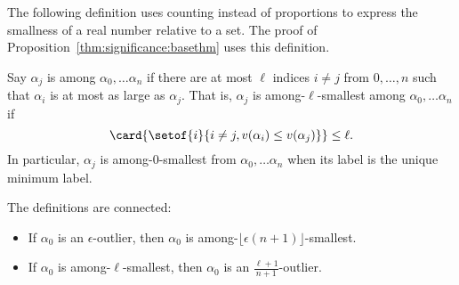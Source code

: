 \documentclass[12pt]{article}
\begin{document}
The following definition uses counting instead of proportions to express
the smallness of a real number relative to a set.  The proof of 
Proposition~\ref{thm:significance:basethm}  uses this definition.

\begin{definition}
    Say \( \alpha_j \) is %
    among \( \alpha_0, \dots \alpha_n \) if there are at most \( \ell \)
    indices \( i \ne j \) from \( 0, \dots, n \) such that  \(
    \alpha_i \) is at most as large as \( \alpha_j \).  That is, \(
    \alpha_j \) is among-\( \ell \)-smallest among \( \alpha_0, \dots
    \alpha_n \) if
    \[
      \card{ \setof{i}{i \ne j, v(\alpha_i) \le v(\alpha_j)}}
      \le \ell.
    \]  In particular, \( \alpha_j \) is among-\( 0 \)-smallest
    from \( \alpha_0, \dots \alpha_n \) when its label is the unique
    minimum label.
\end{definition}

\begin{remark}
    The definitions are connected:
    \begin{itemize}
        \item
            If \( \alpha_0 \) is an \( \epsilon \)-outlier, then \(
            \alpha_0 \) is among-\( \lfloor \epsilon (n+1) \rfloor \)-smallest.
        \item
            If \( \alpha_0 \) is among-\( \ell \)-smallest, then \(
            \alpha_0 \) is an \( \frac{\ell + 1}{n+1} \)-outlier.
    \end{itemize}
\end{remark}
\end{document}
